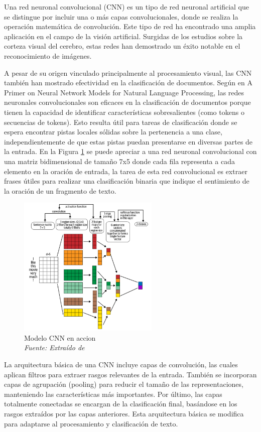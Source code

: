 Una red neuronal convolucional (CNN) es un tipo de red neuronal artificial que se distingue por incluir una o más capas convolucionales, donde se realiza la operación matemática de convolución. Este tipo de red ha encontrado una amplia aplicación en el campo de la visión artificial. Surgidas de los estudios sobre la corteza visual del cerebro, estas redes han demostrado un éxito notable en el reconocimiento de imágenes.


A pesar de su origen vinculado principalmente al procesamiento visual, las CNN también han mostrado efectividad en la clasificación de documentos. Según \cite{goldberg2016primer} en A Primer on Neural Network Models for Natural Language Processing, las redes neuronales convolucionales son eficaces en la clasificación de documentos porque tienen la capacidad de identificar características sobresalientes (como tokens o secuencias de tokens). Esto resulta útil para tareas de clasificación donde se espera encontrar pistas locales sólidas sobre la pertenencia a una clase, independientemente de que estas pistas puedan presentarse en diversas partes de la entrada. En la Figura \ref{fig:an9} se puede apreciar a una red neuronal convolucional con una matriz bidimensional de tamaño 7x5 donde cada fila representa a cada elemento en la oración de entrada, la tarea de esta red convolucional es extraer frases útiles para realizar una clasificación binaria que indique el sentimiento de la oración de un fragmento de texto.
\begin{figure}[h!]
	\includegraphics[width=0.6\textwidth]{capitulo2/figuras/an9.png}
	\caption{Modelo CNN en accion
		\\\textit{Fuente: Extraído de} \protect\cite[p. 25]{vajjala2020practical}}
	\label{fig:an9}
\end{figure}

La arquitectura básica de una CNN incluye capas de convolución, las cuales aplican filtros para extraer rasgos relevantes de la entrada. También se incorporan capas de agrupación (pooling) para reducir el tamaño de las representaciones, manteniendo las características más importantes. Por último, las capas totalmente conectadas se encargan de la clasificación final, basándose en los rasgos extraídos por las capas anteriores. Esta arquitectura básica se modifica para adaptarse al procesamiento y clasificación de texto.

